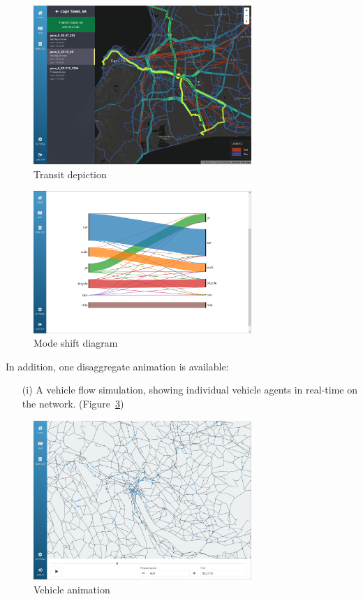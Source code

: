 \documentclass[Afour,sagev,times]{sagej}
\begin{document}
\begin{figure}
\centering
\includegraphics[width=3.25in]{fig-transit.png}
\caption{Transit depiction}\label{Ftransit}
\end{figure}

\begin{figure}
\centering
\includegraphics[width=3.25in]{fig-sankey.png}
\caption{Mode shift diagram}\label{Fsankey}
\end{figure}

In addition, one disaggregate animation is available:

\begin{enumerate}
\item[(i)] A vehicle flow simulation, showing individual vehicle agents in real-time on the network. (Figure~\ref{Fanim})
\end{enumerate}

\begin{figure}
\centering
\includegraphics[width=3.25in]{fig-animation.png}
\caption{Vehicle animation}\label{Fanim}
\end{figure}
\end{document}
